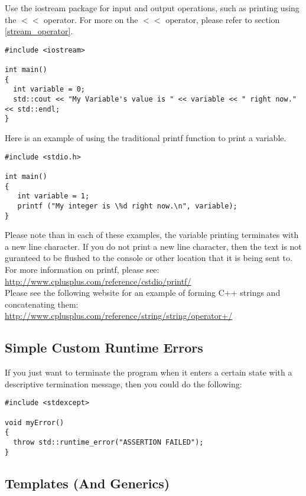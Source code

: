 \documentclass[12pt, letterpaper]{article}
\begin{document}
Use the iostream package for input and output operations, such as printing using the $<<$ operator. For more on the $<<$ operator, please refer to section \ref{stream_operator}.

\begin{verbatim}
#include <iostream> 

int main()
{
  int variable = 0;
  std::cout << "My Variable's value is " << variable << " right now." << std::endl;
}
\end{verbatim}

Here is an example of using the traditional printf function to print a variable.

\begin{verbatim}
#include <stdio.h>

int main()
{
   int variable = 1;
   printf ("My integer is \%d right now.\n", variable);
}
\end{verbatim}

Please note than in each of these examples, the variable printing terminates with a new line character. If you do not print a new line character, then the text is not guranteed to be flushed to the console or other location that it is being sent to.\\

For more information on printf, please see:
\href{http://www.cplusplus.com/reference/cstdio/printf/}{http://www.cplusplus.com/reference/cstdio/printf/}\\

Please see the following website for an example of forming C++ strings and concatenating them:
\href{http://www.cplusplus.com/reference/string/string/operator+/}{http://www.cplusplus.com/reference/string/string/operator+/}

\subsection{Simple Custom Runtime Errors}

If you just want to terminate the program when it enters a certain state with a descriptive termination message, then you could do the following:

\begin{verbatim}
#include <stdexcept>

void myError()
{
  throw std::runtime_error("ASSERTION FAILED");
}

\end{verbatim}

\subsection{Templates (And Generics)}
\end{document}
